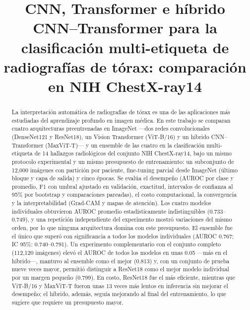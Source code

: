 \documentclass[conference]{IEEEtran}
\begin{document}
\title{CNN, Transformer e híbrido CNN--Transformer para la clasificación multi-etiqueta de radiografías de tórax: comparación en NIH ChestX-ray14}

\author{
}

\maketitle

\begin{abstract}
La interpretación automática de radiografías de tórax es una de las aplicaciones más estudiadas del aprendizaje profundo en imagen médica. En este trabajo se comparan cuatro arquitecturas preentrenadas en ImageNet ---dos redes convolucionales (DenseNet121 y ResNet18), un Vision Transformer (ViT-B/16) y un híbrido CNN--Transformer (MaxViT-T)--- y un ensemble de las cuatro en la clasificación multi-etiqueta de 14 hallazgos radiológicos del conjunto NIH ChestX-ray14, bajo un mismo protocolo experimental y un mismo presupuesto de entrenamiento: un subconjunto de 12{,}000 imágenes con partición por paciente, fine-tuning parcial desde ImageNet (último bloque y capa de salida) y cinco épocas. Se evalúa el desempeño (AUROC por clase y promedio, F1 con umbral ajustado en validación, exactitud, intervalos de confianza al 95\% por bootstrap y comparaciones pareadas), el costo computacional, la convergencia y la interpretabilidad (Grad-CAM y mapas de atención). Los cuatro modelos individuales obtuvieron AUROC promedio estadísticamente indistinguibles (0.733--0.749), y una repetición independiente del experimento mostró variaciones del mismo orden, por lo que ninguna arquitectura domina con este presupuesto. El ensemble fue el único que superó con significancia a todos los modelos individuales (AUROC 0.767; IC 95\%: 0.740--0.791). Un experimento complementario con el conjunto completo (112{,}120 imágenes) elevó el AUROC de todos los modelos en unas 0.05 ---más en el híbrido---, mantuvo al ensemble como el mejor (0.813) y, con un conjunto de prueba nueve veces mayor, permitió distinguir a ResNet18 como el mejor modelo individual por un margen pequeño (0.799). En costo, ResNet18 fue el más eficiente, mientras que ViT-B/16 y MaxViT-T fueron unas 13 veces más lentos en inferencia sin mejorar el desempeño; el híbrido, además, seguía mejorando al final del entrenamiento, lo que sugiere que requiere un presupuesto mayor.
\end{abstract}
\end{document}
